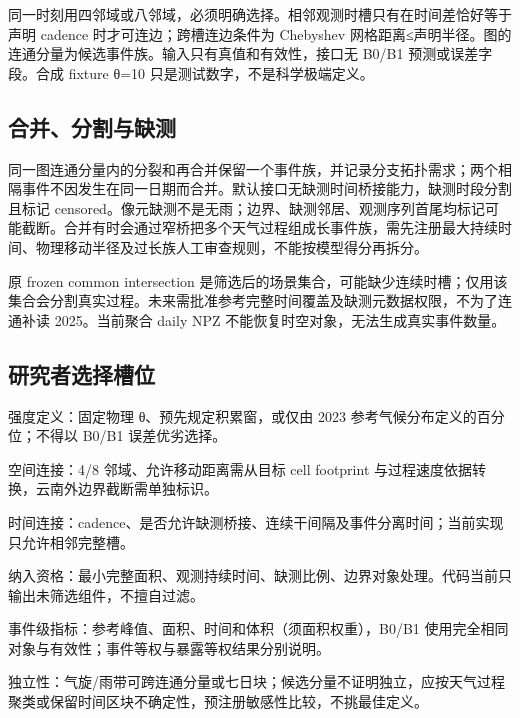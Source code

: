 \documentclass[UTF8,a4paper,10pt,fontset=fandol]{ctexart}
\begin{document}
同一时刻用四邻域或八邻域，必须明确选择。相邻观测时槽只有在时间差恰好等于声明 cadence 时才可连边；跨槽连边条件为 Chebyshev 网格距离≤声明半径。图的连通分量为候选事件族。输入只有真值和有效性，接口无 B0/B1 预测或误差字段。合成 fixture θ=10 只是测试数字，不是科学极端定义。\par

\subsection*{合并、分割与缺测}

同一图连通分量内的分裂和再合并保留一个事件族，并记录分支拓扑需求；两个相隔事件不因发生在同一日期而合并。默认接口无缺测时间桥接能力，缺测时段分割且标记 censored。像元缺测不是无雨；边界、缺测邻居、观测序列首尾均标记可能截断。合并有时会通过窄桥把多个天气过程组成长事件族，需先注册最大持续时间、物理移动半径及过长族人工审查规则，不能按模型得分再拆分。\par

原 frozen common intersection 是筛选后的场景集合，可能缺少连续时槽；仅用该集合会分割真实过程。未来需批准参考完整时间覆盖及缺测元数据权限，不为了连通补读 2025。当前聚合 daily NPZ 不能恢复时空对象，无法生成真实事件数量。\par

\subsection*{研究者选择槽位}

\noindent\textbullet\quad 强度定义：固定物理 θ、预先规定积累窗，或仅由 2023 参考气候分布定义的百分位；不得以 B0/B1 误差优劣选择。\par
\noindent\textbullet\quad 空间连接：4/8 邻域、允许移动距离需从目标 cell footprint 与过程速度依据转换，云南外边界截断需单独标识。\par
\noindent\textbullet\quad 时间连接：cadence、是否允许缺测桥接、连续干间隔及事件分离时间；当前实现只允许相邻完整槽。\par
\noindent\textbullet\quad 纳入资格：最小完整面积、观测持续时间、缺测比例、边界对象处理。代码当前只输出未筛选组件，不擅自过滤。\par
\noindent\textbullet\quad 事件级指标：参考峰值、面积、时间和体积（须面积权重），B0/B1 使用完全相同对象与有效性；事件等权与暴露等权结果分别说明。\par
\noindent\textbullet\quad 独立性：气旋/雨带可跨连通分量或七日块；候选分量不证明独立，应按天气过程聚类或保留时间区块不确定性，预注册敏感性比较，不挑最佳定义。\par
\end{document}
